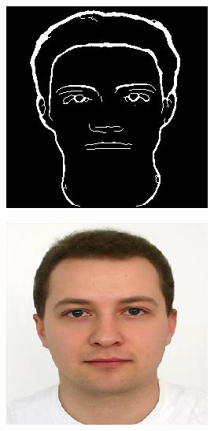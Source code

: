 \documentclass{70_styles/svproc}
\begin{document}
\begin{figure}
\begin{minipage}[b]{0.47\textwidth}
\begin{subfigure}[H]{0.4\textwidth}
         \includegraphics[width=\textwidth]{70_figures/thinned-1 (79).jpg}
     \end{subfigure}
    \par\medskip
     \begin{subfigure}[H]{0.4\textwidth}
         \centering
         \includegraphics[width=\textwidth]{70_figures/1 (662).jpg}

\end{subfigure}
\end{minipage}
\end{figure}
\end{document}
